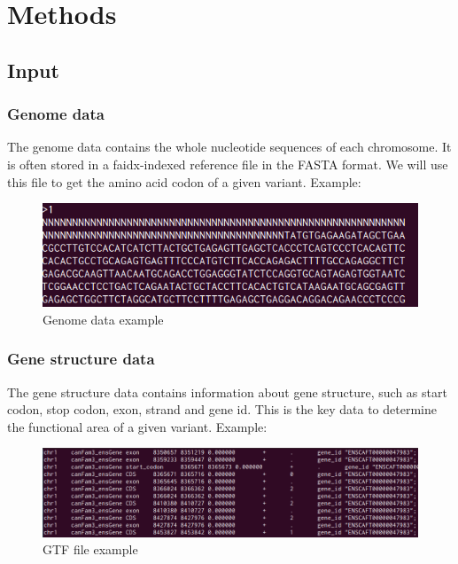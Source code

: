 \documentclass[onehalf,11pt]{beavtex}
\begin{document}
\chapter{Methods}

\section{Input}

\subsection{Genome data}
The genome data contains the whole nucleotide sequences of each chromosome. It is often stored in a faidx-indexed reference file in the FASTA format. We will use this file to get the amino acid codon of a given variant.
Example:

\begin{figure}[!ht]
\centering
\includegraphics[scale=0.8]{./pic/genome.png}
\caption{Genome data example}
\end{figure}

\subsection{Gene structure data}
The gene structure data contains information about gene structure, such as start codon, stop codon, exon, strand and gene id. This is the key data to determine the functional area of a given variant. Example:

\begin{figure}[!ht]
\centering
\includegraphics[scale=0.6]{./pic/gtf.png}
\caption{GTF file example}
\end{figure}
\end{document}
